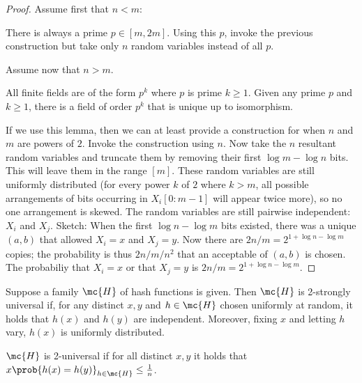 \documentclass[../main.tex]{subfiles}
\begin{document}
\begin{proof}
    Assume first that $n < m$:

    There is always a prime $p \in [m, 2m]$. Using this $p$, invoke
    the previous construction but take only $n$ random variables 
    instead of all $p$.

    Assume now that $n > m$. 

    \begin{lemma}
        All finite fields are of the form $p^k$ where $p$ is prime $k \geq 1$. Given any prime $p$ and $k \geq 1$, there is a field of order $p^k$ that is unique up to isomorphism.
    \end{lemma}

    If we use this lemma, then we can at least provide a construction
    for when $n$ and $m$ are powers of $2$. Invoke the construction
    using $n$. Now take the $n$ resultant random variables and truncate them by removing their first $\log m - \log n$ bits. This will leave
    them in the range $[m]$. These random variables are still
    uniformly distributed (for every power $k$ of $2$ where $k > m$, all possible arrangements of bits occurring in $X_{i}[0:m-1]$ will appear twice more), so no one arrangement is skewed. The random variables are still pairwise independent: $X_{i}$ and $X_{j}$. Sketch: When the first $\log n - \log m$ bits existed, there was a unique $(a,b)$ that allowed $X_{i} = x$ and $X_{j} = y$. Now there are $2n/m = 2^{1 + \log n - \log m}$ copies; the probability is thus $2n/m \bigg/ n^2$ that an acceptable of $(a,b)$ is chosen. The probabiliy that $X_{i} = x$ or that $X_{j} = y$ is $2n/m = 2^{1 + \log n - \log m}$.
\end{proof}


\begin{definition}
    Suppose a family $\mc{H}$ of hash functions is given. Then
    $\mc{H}$ is 2-strongly universal if, for any distinct $x,y$ and $h \in \mc{H}$ chosen uniformly at random, it holds that
    $h(x)$ and $h(y)$ are independent. Moreover, fixing $x$
    and letting $h$ vary, $h(x)$ is uniformly distributed.
\end{definition}

\begin{definition}
    $\mc{H}$ is 2-universal if for all distinct $x,y$ it holds
    that $x\prob{h(x) = h(y)}_{h \in \mc{H}} \leq \frac{1}{n}$.
\end{definition}
\end{document}
